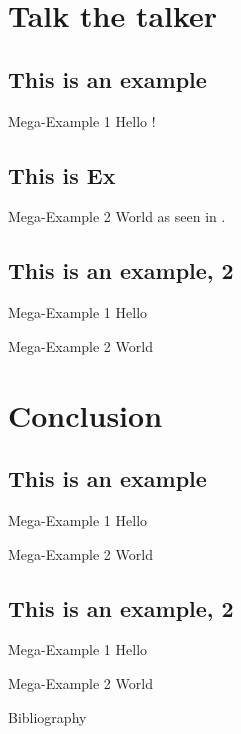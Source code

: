 \documentclass[aspectratio=169,usepdftitle=true]{beamer}
\begin{document}
\section{Talk the talker}
\subsection{This is an example}

\begin{frame}{Mega-Example 1}
    Hello \cite{dirac}!
\end{frame}

\subsection{This is Ex}
\begin{frame}{Mega-Example 2}
    World as seen in \cite{einstein}.
\end{frame}

\subsection{This is an example, 2}

\begin{frame}{Mega-Example 1}
    Hello
\end{frame}

\begin{frame}{Mega-Example 2}
    World
\end{frame}


\section{Conclusion}
\subsection{This is an example}

\begin{frame}{Mega-Example 1}
    Hello
\end{frame}

\begin{frame}{Mega-Example 2}
    World
\end{frame}

\subsection{This is an example, 2}

\begin{frame}{Mega-Example 1}
    Hello
\end{frame}

\begin{frame}{Mega-Example 2}
    World
\end{frame}

\begin{frame}{Bibliography}
    \printBibCommand
\end{frame}
\end{document}
